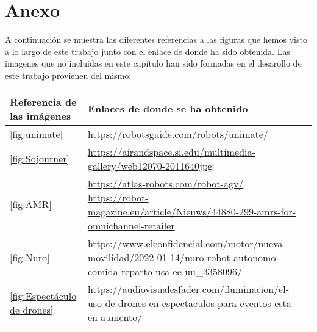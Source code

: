 \chapter{Anexo}
\label{cap:anexo}
\setcounter{page}{1}
A continuación se muestra las diferentes referencias a las figuras que hemos visto a lo largo de este trabajo junto con el enlace 
de donde ha sido obtenida. Las imagenes que no incluidas en este capítulo han sido formadas en el desarollo de este trabajo provienen 
del mismo: 
\bigskip

\begin{tabular}{ | m{4cm} | m{10cm}| m{1cm} | }
    \hline
    \textbf{Referencia de las imágenes} & \textbf{Enlaces de donde se ha obtenido}  \\
    \hline
    \ref{fig:unimate} & \url{https://robotsguide.com/robots/unimate/} \\   
    \hline
    \ref{fig:Sojourner} & \url{https://airandspace.si.edu/multimedia-gallery/web12070-2011640jpg} \\ 
    \hline
    \ref{fig:AMR} & \url{https://atlas-robots.com/robot-agv/} \newline   
    \url{https://robot-magazine.eu/article/Nieuws/44880-299-amrs-for-omnichannel-retailer} \\
    \hline
    \ref{fig:Nuro} & \url{https://www.elconfidencial.com/motor/nueva-movilidad/2022-01-14/nuro-robot-autonomo-comida-reparto-usa-ee-uu_3358096/} \\
    \hline
    \ref{fig:Espectáculo de drones} & \url{https://audiovisualesfader.com/iluminacion/el-uso-de-drones-en-espectaculos-para-eventos-esta-en-aumento/} \\
    \hline 
   
   
\end{tabular}

